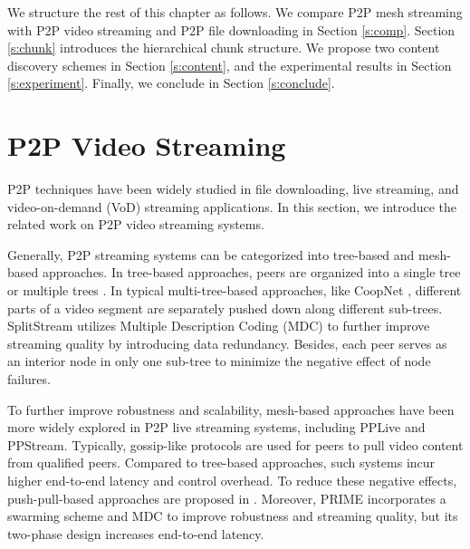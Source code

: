     We structure the rest of this chapter as follows.  
    We
    compare P2P mesh streaming with P2P video streaming and
    P2P file downloading in Section \ref{s:comp}.  
    Section \ref{s:chunk} introduces the hierarchical chunk structure.
    We propose two content discovery schemes
    in Section \ref{s:content}, and the experimental results in Section
    \ref{s:experiment}.
    Finally, we conclude in Section \ref{s:conclude}.

\section{P2P Video Streaming}
\label{ss:related_p2p}
P2P techniques have been widely studied in file downloading, live
streaming, and video-on-demand (VoD) streaming applications. In this section,
we introduce the related work on P2P video streaming systems.

Generally, P2P streaming systems can be categorized into tree-based
and mesh-based approaches. In tree-based approaches, peers are
organized into a single tree \cite{jannotti:overcast, chu:narada}
or multiple trees \cite{castro:splitstream,
padmanabhan:coopnet}.
In typical multi-tree-based
approaches, like CoopNet \cite{padmanabhan:coopnet}, different parts of a video segment are
separately pushed down along different sub-trees. SplitStream
\cite{castro:splitstream}
utilizes Multiple Description Coding (MDC) to further improve
streaming quality by introducing data redundancy. Besides, each peer
serves as an interior node in only one sub-tree to minimize the
negative effect of node failures. 

To further improve robustness and scalability, mesh-based approaches
have been more widely explored in P2P live streaming systems,
including PPLive and PPStream. Typically, gossip-like protocols are
used for peers to pull video content from qualified peers. Compared to
tree-based approaches, such systems incur higher end-to-end latency
and control overhead. To reduce these negative effects,
push-pull-based approaches are proposed in \cite{zhang:coolstreaming}. 
Moreover, PRIME \cite{magharei:prime}
incorporates a swarming scheme and MDC to improve robustness and
streaming quality, but its two-phase design increases end-to-end
latency.

